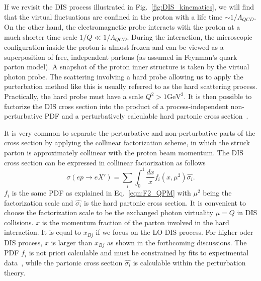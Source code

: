 If we revisit the DIS process illustrated in Fig.~\ref{fig:DIS_kinematics}, we
will find that the virtual fluctuations are confined in the proton with a life
time $\sim 1/\Lambda_{QCD}$. On the other hand, the electromagnetic probe
interacts with the proton at a much shorter time scale $1/Q \ll
1/\Lambda_{QCD}$. During the interaction, the microscopic configuration inside
the proton is almost frozen and can be viewed as a superposition of free,
independent partons (as assumed in Feynman's quark parton model). A snapshot of
the proton inner structure is taken by the virtual photon probe. The scattering
involving a hard probe allowing us to apply the purterbation method like this is
usually referred to as the hard scattering process. Practically, the hard probe
must have a scale $Q^{2}>1 \mathrm{GeV}^{2}$. It is then possible to factorize
the DIS cross section into the product of a process-independent non-perturbative
PDF and a perturbatively calculable hard partonic cross
section~\cite{Sterman:1995fz}.

It is very common to separate the perturbative and non-perturbative parts of the
cross section by applying the collinear factorization scheme, in which the
struck parton is approximately collinear with the proton beam momentum. The DIS
cross section can be expressed in collinear factorization as follows
\begin{equation}
\sigma(ep\rightarrow eX')=\sum_{i} \int^{1}_{0}\frac{dx}{x}f_{i}(x,\mu^{2})\hat{\sigma_{i}}.
\label{eqn:coll_factor}
\end{equation}
$f_{i}$ is the same PDF as explained in Eq.~\ref{eqn:F2_QPM} with $\mu^{2}$
being the factorization scale and $\hat{\sigma_{i}}$ is the hard partonic cross
section. It is convenient to choose the factorization scale to be the exchanged
photon virtuality $\mu=Q$ in DIS collisions. $x$ is the momentum fraction of the
parton involved in the hard interaction. It is equal to $x_{Bj}$ if we focus on
the LO DIS process. For higher oder DIS process, $x$ is larger than $x_{Bj}$ as
shown in the forthcoming discussions. The PDF $f_{i}$ is not priori calculable
and must be constrained by fits to experimental data~\cite{Aaron:2009aa}, while
the partonic cross section $\hat{\sigma_{i}}$ is calculable within the
perturbation theory.


